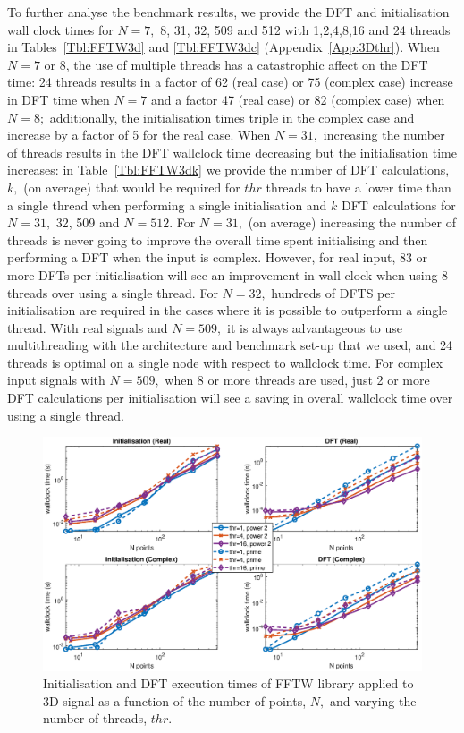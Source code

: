 \documentclass[a4paper]{article}
\begin{document}
To further analyse the benchmark results, we provide the DFT and
initialisation wall clock times for $N=7,$ 8, 31, 32, 509 and 512 with
1,2,4,8,16 and 24 threads in Tables~\ref{Tbl:FFTW3d} and
\ref{Tbl:FFTW3dc} (Appendix~\ref{App:3Dthr}). When $N=7$ or 8, the use of multiple threads has a
catastrophic affect on the DFT time: 24 threads results in a factor of
62 (real case) or 75 (complex case) increase in DFT time when $N=7$
and a factor 47 (real case) or 82 (complex case) when $N=8;$
additionally, the initialisation times triple in the complex case and
increase by a factor of 5 for the real case. When $N=31,$ increasing
the number of threads results in the DFT wallclock time decreasing but
the initialisation time increases: in Table~\ref{Tbl:FFTW3dk} we
provide the number of DFT calculations, $k,$ (on average) that would
be required for $thr$ threads to have a lower time than a single
thread when performing a single initialisation and $k$ DFT
calculations for $N=31,$ 32, 509 and $N=512.$ For $N=31,$ (on average)
increasing the number of threads is never going to improve the overall
time spent initialising and then performing a DFT when the input is
complex. However, for real input, 83 or more DFTs per initialisation
will see an improvement in wall clock when using 8 threads over using
a single thread. For $N=32,$ hundreds of DFTS per initialisation are
required in the cases where it is possible to outperform a single
thread. With real signals and $N=509,$ it is always advantageous to
use multithreading with the architecture and benchmark set-up that we
used, and 24 threads is optimal on a single node with respect to
wallclock time. For complex input signals with $N=509,$ when 8 or more
threads are used, just 2 or more DFT calculations per initialisation
will see a saving in overall wallclock time over using a single
thread.

\begin{figure}[htb]
    \centering
    \includegraphics[width=0.9\linewidth]{../results/fftw_3d_thr.eps}
  \caption{Initialisation and DFT execution times of FFTW library applied to 3D signal as a function of the
    number of points, $N,$ and varying the number of threads, $thr.$ }
  \label{3DFFTW}
\end{figure}
\end{document}
